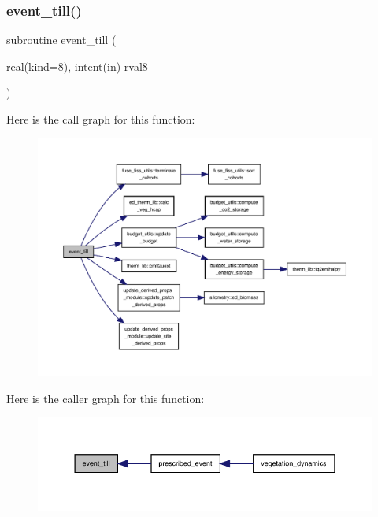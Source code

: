 \subsubsection{\texorpdfstring{event\+\_\+till()}{event\_till()}}
{\footnotesize\ttfamily subroutine event\+\_\+till (\begin{DoxyParamCaption}\item[{real(kind=8), intent(in)}]{rval8 }\end{DoxyParamCaption})}

Here is the call graph for this function\+:
\nopagebreak
\begin{figure}[H]
\begin{center}
\leavevmode
\includegraphics[width=350pt]{events_8f90_a344468d6236c4635f3bd01bc47acde4a_cgraph}
\end{center}
\end{figure}
Here is the caller graph for this function\+:
\nopagebreak
\begin{figure}[H]
\begin{center}
\leavevmode
\includegraphics[width=350pt]{events_8f90_a344468d6236c4635f3bd01bc47acde4a_icgraph}
\end{center}
\end{figure}
\mbox{\label{events_8f90_ad9f17e2da07d80a0734f81d8b2e27d25}} 
